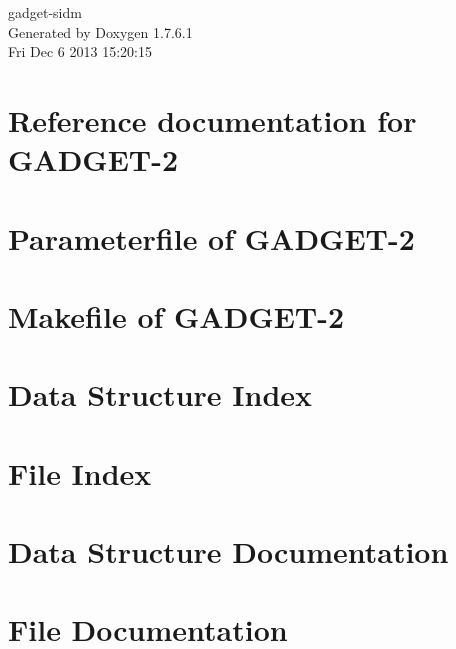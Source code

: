 \documentclass[a4paper]{book}
\begin{document}
\hypersetup{pageanchor=false,citecolor=blue}
\begin{titlepage}
\vspace*{7cm}
\begin{center}
{\Large gadget-\/sidm }\\
\vspace*{1cm}
{\large \-Generated by Doxygen 1.7.6.1}\\
\vspace*{0.5cm}
{\small Fri Dec 6 2013 15:20:15}\\
\end{center}
\end{titlepage}
\clearemptydoublepage
{}
\tableofcontents
\clearemptydoublepage
{}
\hypersetup{pageanchor=true,citecolor=blue}
\chapter{\-Reference documentation for \-G\-A\-D\-G\-E\-T-\/2}
\label{index}\hypertarget{index}{}
\chapter{\-Parameterfile of \-G\-A\-D\-G\-E\-T-\/2}
\label{parameterfile}
\hypertarget{parameterfile}{}

\chapter{\-Makefile of \-G\-A\-D\-G\-E\-T-\/2}
\label{Gadget-Makefile}
\hypertarget{Gadget-Makefile}{}

\chapter{\-Data \-Structure \-Index}

\chapter{\-File \-Index}

\chapter{\-Data \-Structure \-Documentation}


\chapter{\-File \-Documentation}
































\printindex
\end{document}
